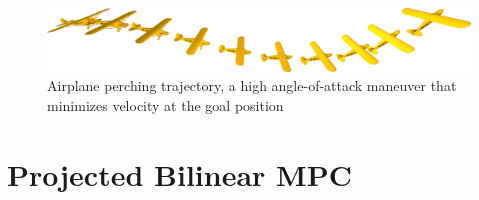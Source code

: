 \documentclass{article}
\begin{document}
\begin{figure}
  \centering
  \includegraphics[width=\textwidth]{perch_cropped.png}
  \caption{Airplane perching trajectory, a high angle-of-attack maneuver that minimizes 
    velocity at the goal position}
  \label{fig:perch}
\end{figure}

\section{Projected Bilinear MPC} \label{sec:projected_mpc}
\end{document}
